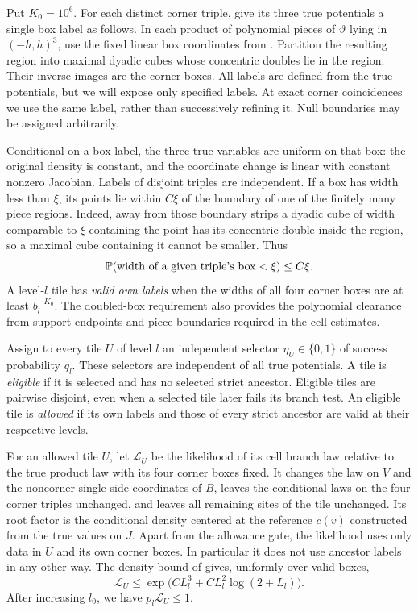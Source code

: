 Put $K_0=10^6$.  For each distinct corner triple, give its three true
potentials a single box label as follows.  In each product of polynomial
pieces of $\vartheta$ lying in $(-h,h)^3$, use the fixed linear box
coordinates from .  Partition the resulting region into
maximal dyadic cubes whose concentric doubles lie in the region.  Their
inverse images are the corner boxes.  All labels are defined from the
true potentials, but we will expose only specified labels.  At exact
corner coincidences we use the same label, rather than successively
refining it.  Null boundaries may be assigned arbitrarily.

Conditional on a box label, the three true variables are uniform on that
box: the original density is constant, and the coordinate change is
linear with constant nonzero Jacobian.  Labels of disjoint triples are
independent.  If a box has width less than $\xi$, its points lie within
$C\xi$ of the boundary of one of the finitely many piece regions.
Indeed, away from those boundary strips a dyadic cube of width comparable
to $\xi$ containing the point has its concentric double inside the region,
so a maximal cube containing it cannot be smaller.  Thus
\begin{equation}
 \mathbb P(\text{width of a given triple's box}<\xi)
       \le C\xi.
 \label{hier:small-box}
\end{equation}
A level-$l$ tile has \emph{valid own labels} when the widths of all four
corner boxes are at least $b_l^{-K_0}$.  The doubled-box requirement also
provides the polynomial clearance from support endpoints and piece
boundaries required in the cell estimates.

Assign to every tile $U$ of level $l$ an independent selector
$\eta_U\in\{0,1\}$ of success probability $q_l$.  These selectors are
independent of all true potentials.  A tile is \emph{eligible} if it is
selected and has no selected strict ancestor.  Eligible tiles are
pairwise disjoint, even when a selected tile later fails its branch test.
An eligible tile is \emph{allowed} if its own labels and those of every
strict ancestor are valid at their respective levels.

For an allowed tile $U$, let $\mathcal L_U$ be the likelihood of its cell
branch law relative to the true product law with its four corner boxes
fixed.  It changes the law on $V$ and the noncorner single-side
coordinates of $B$, leaves the conditional laws on the four corner
triples unchanged, and leaves all remaining sites of the tile unchanged.
Its root factor is the conditional density centered at the reference
$c(v)$ constructed from the true values on $J$.  Apart from the
allowance gate, the likelihood uses only data in $U$ and its own corner
boxes.  In particular it does not use ancestor labels in any other way.
The density bound of  gives, uniformly over valid boxes,
\[
 \mathcal L_U\le
       \exp\bigl(C L_l^3+C L_l^2\log(2+L_l)\bigr).
\]
After increasing $l_0$, we have $p_l\mathcal L_U\le1$.

